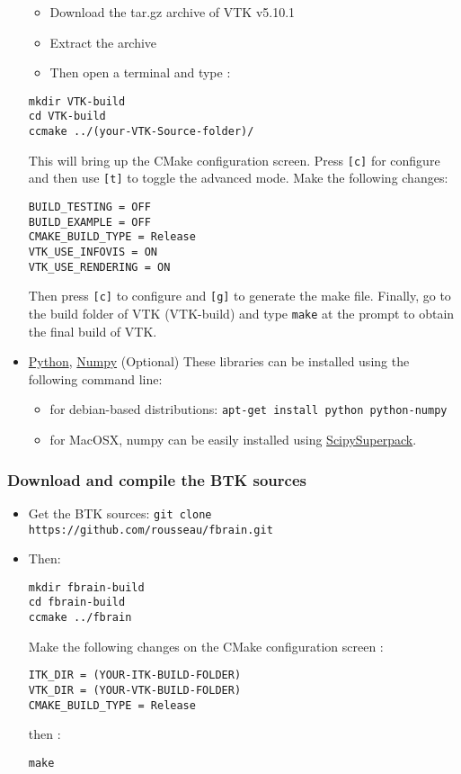 \documentclass[a4paper,10pt]{article}
\begin{document}
\begin{itemize}
 \begin{itemize}
 \item Download the tar.gz archive of VTK v5.10.1
 \item Extract the archive 
 \item Then open a terminal and type :
 \end{itemize}
\begin{verbatim}
mkdir VTK-build
cd VTK-build
ccmake ../(your-VTK-Source-folder)/
\end{verbatim}
This will bring up the CMake configuration screen. Press \texttt{[c]} for
configure and then use \texttt{[t]} to toggle the advanced mode. Make the
following changes:
\begin{verbatim}
BUILD_TESTING = OFF
BUILD_EXAMPLE = OFF
CMAKE_BUILD_TYPE = Release
VTK_USE_INFOVIS = ON
VTK_USE_RENDERING = ON

\end{verbatim}

Then press \texttt{[c]} to configure and \texttt{[g]} to generate the make file.
Finally, go to the build folder of VTK (VTK-build) and type \texttt{make} at the prompt to obtain the final build of VTK.
 \item \href{http://www.python.org/}{Python}, \href{http://numpy.scipy.org/}{Numpy} (Optional)
 These libraries can be installed using the following command line:
 \begin{itemize}
     \item for debian-based distributions: \texttt{apt-get install python python-numpy}
     \item for MacOSX, numpy can be easily installed using \href{http://fonnesbeck.github.com/ScipySuperpack/}{ScipySuperpack}.
 \end{itemize}
\end{itemize}

\subsubsection{Download and compile the BTK sources}
\begin{itemize}
 \item Get the BTK sources: \texttt{git clone https://github.com/rousseau/fbrain.git }
 \item Then:
\begin{verbatim}
mkdir fbrain-build
cd fbrain-build
ccmake ../fbrain
\end{verbatim}
Make the following changes on the CMake configuration screen :
\begin{verbatim}
ITK_DIR = (YOUR-ITK-BUILD-FOLDER)
VTK_DIR = (YOUR-VTK-BUILD-FOLDER)
CMAKE_BUILD_TYPE = Release
\end{verbatim}
then :
\begin{verbatim}
make
\end{verbatim}
\end{itemize}
\end{document}
